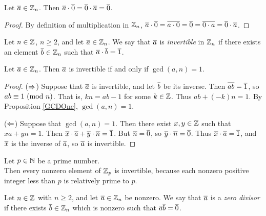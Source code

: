 \documentclass{amsart}
\begin{document}
\begin{Prop}
Let $\overline{a} \in \mathbb{Z}_{n}$. Then $\overline{a}\cdot\overline{0} =
\overline{0}\cdot\overline{a} = \overline{0}$.
\end{Prop}

\begin{proof}
By definition of multiplication in $\mathbb{Z}_{n}$, $\overline{a} \cdot \overline{0}
= \overline{a \cdot 0}
        = \overline{0} = \overline{0 \cdot a} = \overline{0} \cdot \overline{a}$.
\end{proof}

\begin{Def}
Let $n \in \mathbb{Z}$, $n \ge 2$, and let $\overline{a} \in \mathbb{Z}_n$.
We say that $\overline{a}$ is {\em invertible} in $\mathbb{Z}_n$ if there
exists an element $\overline{b} \in \mathbb{Z}_{n}$ such that
$\overline{a}\cdot\overline{b} = \overline{1}$.
\end{Def}

\begin{Prop} \label{GCDInv}
Let $\overline{a} \in \mathbb{Z}_{n}$.
Then $\overline{a}$ is invertible if and only if $\gcd(a,n) = 1$.
\end{Prop}

\begin{proof}
\text{ }

($\Rightarrow$) Suppose that $\overline{a}$ is invertible, and let $\overline{b}$ be
its inverse. Then $\overline{ab} = \overline{1}$, so $ab \equiv 1 \text{\rm{ (mod }}{n}\text{\rm{)}}$.
That is, $kn = ab-1$ for some $k \in \mathbb{Z}$. Thus $ab + (-k)n = 1$.
By Proposition \ref{GCDOne}, $\gcd(a,n) = 1$.

($\Leftarrow$) Suppose that $\gcd(a,n) = 1$. Then there exist $x,y \in
\mathbb{Z}$ such that $xa + yn = 1$. Then $\overline{x} \cdot \overline{a} + \overline{y}
\cdot \overline{n} = \overline{1}$. But $\overline{n} = \overline{0}$, so $\overline{y} \cdot
\overline{n} = \overline{0}$. Thus $\overline{x} \cdot \overline{a} = \overline{1}$, and
$\overline{x}$ is the inverse of $\overline{a}$, so $\overline{a}$ is invertible.
\end{proof}

\begin{Exm}
Let $p \in \mathbb{N}$ be a prime number. \\
Then every nonzero element of $\mathbb{Z}_{p}$ is invertible, because each nonzero positive integer
less than $p$ is relatively prime to $p$.
\end{Exm}

\begin{Def}
Let $n \in \mathbb{Z}$ with $n \ge 2$, and let $\overline{a} \in \mathbb{Z}_n$ be nonzero.
We say that $\overline{a}$ is a {\em zero divisor} if
there exists $\overline{b} \in \mathbb{Z}_n$ which is nonzero
such that $\overline{a} \overline{b} = \overline{0}$.
\end{Def}
\end{document}
